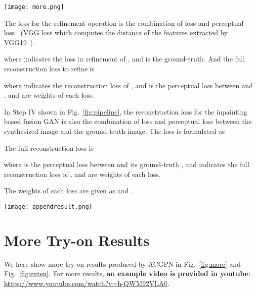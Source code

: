 \documentclass[10pt,twocolumn,letterpaper]{article}
\begin{document}
\begin{figure*}[htb]
\begin{center}
\texttt{[image: more.png]}
\end{center}
   \caption{Extensive try-on results with three difficulty levels. We can see that ACGPN performs equally well for long-sleeve clothes to short-sleeve reference image (fifth row in the middle) and short-sleeve clothes to long-sleeve reference image (fourth row on the left), which demonstrates the generality of our method.
}
\label{fig:more}
\end{figure*}


The loss for the refinement operation is the combination of  loss and perceptual loss~\cite{JohnsonPerceptual} (\ie VGG loss which computes the distance of the features extracted by VGG19~\cite{Simonyan2014Very}).

where  indicates the  loss in refinement of , and  is the ground-truth. And the full reconstruction loss to refine is

where  indicates the reconstruction loss of , and  is the perceptual loss between  and .  and  are weights of each loss.

In Step IV shown in Fig.~\ref{fig:pipeline}, the reconstruction loss for the inpainting based fusion GAN is also the combination of  loss and perceptual loss between the synthesized image and the ground-truth image. The  loss  is formulated as

The full reconstruction loss is

where  is the perceptual loss between  and its ground-truth , and  indicates the full reconstruction loss of .   and  are weights of each loss.

The weights of each loss are given as  and .
\begin{figure*}[htb]
\begin{center}
\texttt{[image: appendresult.png]}
\end{center}
   \caption{Extensive try-on results with four reference people. ACGPN perform robustly with various poses including occlusions and cross-arms. Artifacts are reduced to the minimum.
}
\label{fig:exten}
\end{figure*}
\section{More Try-on Results}
We here show more try-on results produced by ACGPN in Fig.~\ref{fig:more} and Fig.~\ref{fig:exten}. For more results, \textbf{an example video is provided in youtube}:
\url{https://www.youtube.com/watch?v=h-QWM92VLA0}.






\clearpage{}
\end{document}

